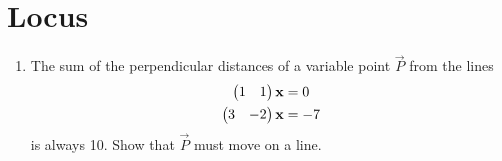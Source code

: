 \documentclass[journal,12pt,twocolumn]{IEEEtran}
\renewcommand\thesection{\arabic{section}}
\begin{document}
\section{Locus}
\renewcommand{\theequation}{\theenumi}
\begin{enumerate}[label=\thesection.\arabic*.,ref=\thesection.\theenumi]
\item The sum of the perpendicular distances of a variable point $\vec{P}$ from the lines
%
\begin{align}
\begin{pmatrix}1 & 1\end{pmatrix}\mathbf{x} &= 0
\\
\begin{pmatrix}3 & -2\end{pmatrix}\mathbf{x} &= -7
\end{align}
%
is always 10.  Show that $\vec{P}$ must move on a line.
\end{enumerate}
\end{document}
